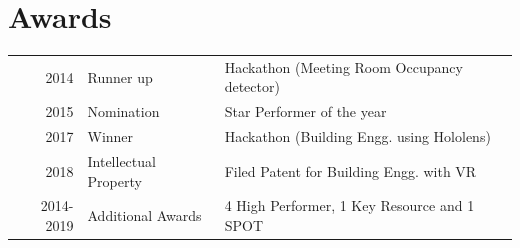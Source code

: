 \documentclass[]{deedy-resume-openfont}
\begin{document}
\begin{minipage}[t]{0.66\textwidth}

\section{Awards} 
\begin{tabular}{rll}
2014	 & Runner up & Hackathon (Meeting Room Occupancy detector)\\
2015	 & Nomination & Star Performer of the year\\
2017	 & Winner & Hackathon (Building Engg. using Hololens)\\
2018     & Intellectual Property & Filed Patent for Building Engg. with VR\\
2014-2019 & Additional Awards & 4 High Performer, 1 Key Resource and 1 SPOT\\
\end{tabular}
\sectionsep

\end{minipage} 
\end{document}
